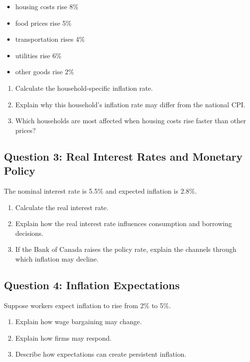 \documentclass[11pt]{article}
\begin{document}
\begin{itemize}
\item housing costs rise 8\%
\item food prices rise 5\%
\item transportation rises 4\%
\item utilities rise 6\%
\item other goods rise 2\%
\end{itemize}

\begin{enumerate}
\item Calculate the household-specific inflation rate.
\item Explain why this household’s inflation rate may differ from the national CPI.
\item Which households are most affected when housing costs rise faster than other prices?
\end{enumerate}


\subsection*{Question 3: Real Interest Rates and Monetary Policy}

The nominal interest rate is 5.5\% and expected inflation is 2.8\%.

\begin{enumerate}
\item Calculate the real interest rate.
\item Explain how the real interest rate influences consumption and borrowing decisions.
\item If the Bank of Canada raises the policy rate, explain the channels through which inflation may decline.
\end{enumerate}


\subsection*{Question 4: Inflation Expectations}

Suppose workers expect inflation to rise from 2\% to 5\%.

\begin{enumerate}
\item Explain how wage bargaining may change.
\item Explain how firms may respond.
\item Describe how expectations can create persistent inflation.
\end{enumerate}
\end{document}
